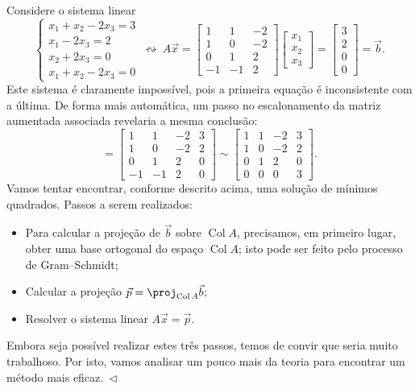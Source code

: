 \begin{ex}\label{exp:minquad1}
  Considere o sistema linear
  \begin{equation}
  \left\{
    \begin{array}{ll}
      x_1 + x_2 - 2x_3 = 3 \\
      x_1  - 2x_3 = 2 \\
      x_2 + 2x_3 = 0 \\
      x_1 + x_2 - 2x_3 = 0
    \end{array}
  \right. \ \leftrightsquigarrow  \
  A \vec{x} = \begin{bmatrix}
    1 & 1 & -2 \\ 1 & 0 & -2 \\ 0 & 1 & 2 \\ -1 & -1 & 2
  \end{bmatrix}
  \begin{bmatrix}
    x_1 \\ x_2 \\ x_3
  \end{bmatrix} =
  \begin{bmatrix}
    3 \\ 2 \\ 0 \\ 0
  \end{bmatrix} = \vec{b}.
  \end{equation} Este sistema é claramente impossível, pois a primeira equação é inconsistente com a última. De forma mais automática, um passo no escalonamento da matriz aumentada associada revelaria a mesma conclusão:
  \begin{equation}
  [\, A \ | \ \vec{b} \, ] = \begin{bmatrix}
    1 & 1 & -2 & 3 \\ 1 & 0 & -2 & 2 \\ 0 & 1 & 2 & 0 \\ -1 & -1 & 2 & 0
  \end{bmatrix}   \sim
  \begin{bmatrix}
    1 & 1 & -2 & 3 \\ 1 & 0 & -2 & 2 \\ 0 & 1 & 2 & 0 \\ 0 & 0 & 0 & 3
  \end{bmatrix} .
  \end{equation} Vamos tentar encontrar, conforme descrito acima, uma solução de mínimos quadrados. Passos a serem realizados:
  \begin{itemize}
  \item Para calcular a projeção de $\vec{b}$ sobre $\operatorname{Col} A$, precisamos, em primeiro lugar, obter uma base ortogonal do espaço $\operatorname{Col} A$; isto pode ser feito pelo processo de Gram--Schmidt;
  \item Calcular a projeção $\vec{p} = \proj_{\operatorname{Col} A} \vec{b}$;
  \item Resolver o sistema linear $A \vec{x} = \vec{p}$.
  \end{itemize} Embora seja possível realizar estes três passos, temos de convir que seria muito trabalhoso. Por isto, vamos analisar um pouco mais da teoria para encontrar um método mais eficaz$. \ \lhd$
\end{ex}

